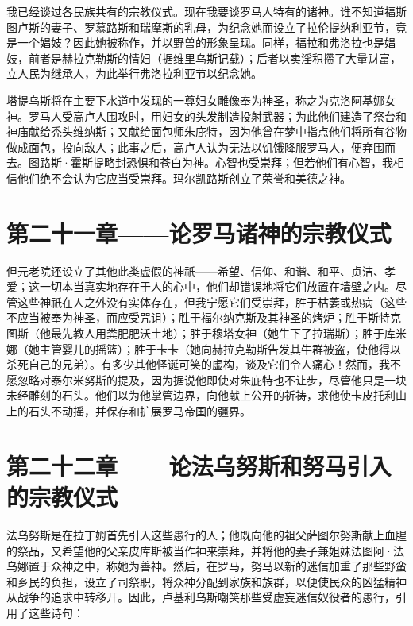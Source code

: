 我已经谈过各民族共有的宗教仪式。现在我要谈罗马人特有的诸神。谁不知道福斯图卢斯的妻子、罗慕路斯和瑞摩斯的乳母，为纪念她而设立了拉伦提纳利亚节，竟是一个娼妓？因此她被称作，并以野兽的形象呈现。同样，福拉和弗洛拉也是娼妓，前者是赫拉克勒斯的情妇（据维里乌斯记载）；后者以卖淫积攒了大量财富，立人民为继承人，为此举行弗洛拉利亚节以纪念她。\par

塔提乌斯将在主要下水道中发现的一尊妇女雕像奉为神圣，称之为克洛阿基娜女神。罗马人受高卢人围攻时，用妇女的头发制造投射武器；为此他们建造了祭台和神庙献给秃头维纳斯；又献给面包师朱庇特，因为他曾在梦中指点他们将所有谷物做成面包，投向敌人；此事之后，高卢人认为无法以饥饿降服罗马人，便弃围而去。图路斯·霍斯提略封恐惧和苍白为神。心智也受崇拜；但若他们有心智，我相信他们绝不会认为它应当受崇拜。玛尔凯路斯创立了荣誉和美德之神。\par


\section{第二十一章——论罗马诸神的宗教仪式}

但元老院还设立了其他此类虚假的神祇——希望、信仰、和谐、和平、贞洁、孝爱；这一切本当真实地存在于人的心中，他们却错误地将它们放置在墙壁之内。尽管这些神祇在人之外没有实体存在，但我宁愿它们受崇拜，胜于枯萎或热病（这些不应当被奉为神圣，而应受咒诅）；胜于福尔纳克斯及其神圣的烤炉；胜于斯特克图斯（他最先教人用粪肥肥沃土地）；胜于穆塔女神（她生下了拉瑞斯）；胜于库米娜（她主管婴儿的摇篮）；胜于卡卡（她向赫拉克勒斯告发其牛群被盗，使他得以杀死自己的兄弟）。有多少其他怪诞可笑的虚构，谈及它们令人痛心！然而，我不愿忽略对泰尔米努斯的提及，因为据说他即使对朱庇特也不让步，尽管他只是一块未经雕刻的石头。他们以为他掌管边界，向他献上公开的祈祷，求他使卡皮托利山上的石头不动摇，并保存和扩展罗马帝国的疆界。\par


\section{第二十二章——论法乌努斯和努马引入的宗教仪式}

法乌努斯是在拉丁姆首先引入这些愚行的人；他既向他的祖父萨图尔努斯献上血腥的祭品，又希望他的父亲皮库斯被当作神来崇拜，并将他的妻子兼姐妹法图阿·法乌娜置于众神之中，称她为善神。然后，在罗马，努马以新的迷信加重了那些野蛮和乡民的负担，设立了司祭职，将众神分配到家族和族群，以便使民众的凶猛精神从战争的追求中转移开。因此，卢基利乌斯嘲笑那些受虚妄迷信奴役者的愚行，引用了这些诗句：\par

